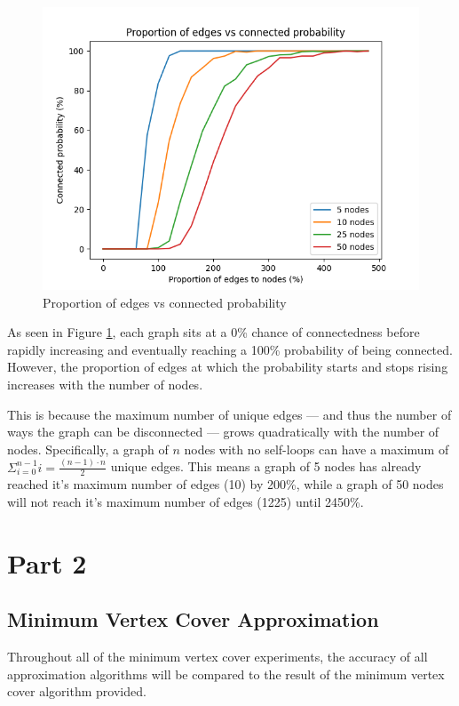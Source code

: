 \documentclass[titlepage]{article}
\begin{document}
\begin{figure}[H]
    \centering
    \includegraphics[width=0.8\linewidth]{experiment_2.png}
    \caption{Proportion of edges vs connected probability}
    \label{fig:edges_vs_connected}
\end{figure}


As seen in Figure \ref{fig:edges_vs_connected}, each graph sits at a 0\% chance of connectedness before rapidly increasing and eventually reaching a 100\% probability of being connected. However, the proportion of edges at which the probability starts and stops rising increases with the number of nodes.

This is because the maximum number of unique edges --- and thus the number of ways the graph can be disconnected --- grows quadratically with the number of nodes. Specifically, a graph of $n$ nodes with no self-loops can have a maximum of $\Sigma_{i=0}^{n-1}i = \frac{(n - 1) \cdot n}{2}$ unique edges. This means a graph of 5 nodes has already reached it's maximum number of edges (10) by 200\%, while a graph of 50 nodes will not reach it's maximum number of edges (1225) until 2450\%.

\section{Part 2}

\subsection{Minimum Vertex Cover Approximation}
Throughout all of the minimum vertex cover experiments, the accuracy of all approximation algorithms will be compared to the result of the minimum vertex cover algorithm provided.
\end{document}
